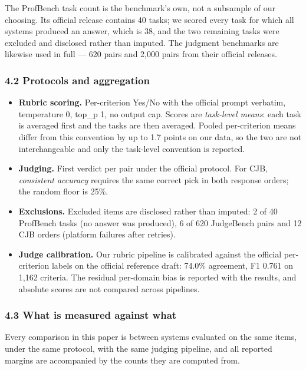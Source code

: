 \documentclass[
]{article}
\providecommand{\tightlist}{%
  \setlength{\itemsep}{0pt}\setlength{\parskip}{0pt}}
\begin{document}
The ProfBench task count is the benchmark's own, not a subsample of our choosing. Its
official release contains 40 tasks; we scored every task for which all systems produced an
answer, which is 38, and the two remaining tasks were excluded and disclosed rather than
imputed. The judgment benchmarks are likewise used in full --- 620 pairs and 2{,}000 pairs
from their official releases.

\subsubsection{4.2 Protocols and aggregation}\label{protocols}

\begin{itemize}
\tightlist
\item
  \textbf{Rubric scoring.} Per-criterion Yes/No with the official prompt verbatim,
  temperature 0, top\_p 1, no output cap. Scores are \emph{task-level means}: each task
  is averaged first and the tasks are then averaged. Pooled per-criterion means differ
  from this convention by up to 1.7 points on our data, so the two are not
  interchangeable and only the task-level convention is reported.
\item
  \textbf{Judging.} First verdict per pair under the official protocol. For CJB,
  \emph{consistent accuracy} requires the same correct pick in both response orders;
  the random floor is 25\%.
\item
  \textbf{Exclusions.} Excluded items are disclosed rather than imputed: 2 of 40
  ProfBench tasks (no answer was produced), 6 of 620 JudgeBench pairs and 12 CJB orders
  (platform failures after retries).
\item
  \textbf{Judge calibration.} Our rubric pipeline is calibrated against the official
  per-criterion labels on the official reference draft: 74.0\% agreement, F1 0.761 on
  1,162 criteria. The residual per-domain bias is reported with the results, and
  absolute scores are not compared across pipelines.
\end{itemize}

\subsubsection{4.3 What is measured against what}\label{against}

Every comparison in this paper is between systems evaluated on the same items, under
the same protocol, with the same judging pipeline, and all reported margins are
accompanied by the counts they are computed from.
\end{document}
